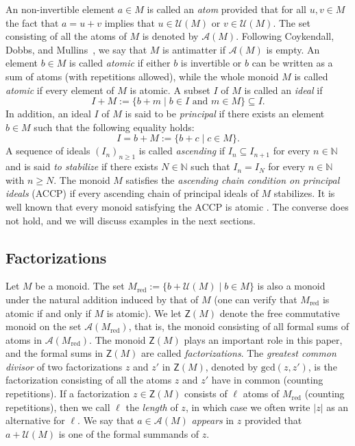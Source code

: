 \documentclass[12pt]{amsart}
\theoremstyle{definition}
\numberwithin{equation}{section}
\newcommand{\nn}{\mathbb{N}}
\newcommand{\ii}{\mathcal{A}}
\newcommand{\uu}{\mathcal{U}}
\begin{document}
An non-invertible element $a \in M$ is called an \emph{atom} provided that for all $u,v \in M$ the fact that $a = u + v$ implies that $u \in \uu(M)$ or $v \in \uu(M)$. The set consisting of all the atoms of $M$ is denoted by $\mathcal{A}(M)$. Following Coykendall, Dobbs, and Mullins~\cite{CDM99}, we say that $M$ is antimatter if $\mathcal{A}(M)$ is empty. An element $b \in M$ is called \emph{atomic} if either $b$ is invertible or $b$ can be written as a sum of atoms (with repetitions allowed), while the whole monoid $M$ is called \emph{atomic} if every element of $M$ is atomic. A subset $I$ of $M$ is called an \emph{ideal} if
\[
	I + M := \{b + m \mid b \in I \text{ and } m \in M \} \subseteq I.
\]
In addition, an ideal $I$ of $M$ is said to be \emph{principal} if there exists an element $b \in M$ such that the following equality holds:
\[
	I = b + M := \{b + c \mid c \in M\}.
\]
A sequence of ideals $(I_n)_{n \ge 1}$ is called \emph{ascending} if $I_n \subseteq I_{n+1}$ for every $n \in \nn$ and is said \emph{to stabilize} if there exists $N \in \nn$ such that $I_n = I_N$ for every $n \in \nn$ with $n \ge N$. The monoid $M$ satisfies the \emph{ascending chain condition on principal ideals} (ACCP) if every ascending chain of principal ideals of $M$ stabilizes. It is well known that every monoid satisfying the ACCP is atomic \cite[Proposition~1.1.4]{GH06}. The converse does not hold, and we will discuss examples in the next sections.


\medskip
\subsection{Factorizations} 

Let $M$ be a monoid. The set $M_{\text{red}} := \{b + \uu(M) \mid b \in M\}$ is also a monoid under the natural addition induced by that of $M$ (one can verify that $M_{\text{red}}$ is atomic if and only if $M$ is atomic). We let $\mathsf{Z}(M)$ denote the free commutative monoid on the set $\mathcal{A}(M_{\text{red}})$, that is, the monoid consisting of all formal sums of atoms in $\mathcal{A}(M_{\text{red}})$. The monoid $\mathsf{Z}(M)$ plays an important role in this paper, and the formal sums in $\mathsf{Z}(M)$ are called \emph{factorizations}. The \emph{greatest common divisor} of two factorizations $z$ and $z'$ in $\mathsf{Z}(M)$, denoted by $\text{gcd}(z,z')$, is the factorization consisting of all the atoms $z$ and $z'$ have in common (counting repetitions). If a factorization $z \in \mathsf{Z}(M)$ consists of $\ell$ atoms of $M_{\text{red}}$ (counting repetitions), then we call $\ell$ the \emph{length} of $z$, in which case we often write $|z|$ as an alternative for $\ell$. We say that $a \in \ii(M)$ \emph{appears} in $z$ provided that $a + \uu(M)$ is one of the formal summands of $z$. 
\end{document}
